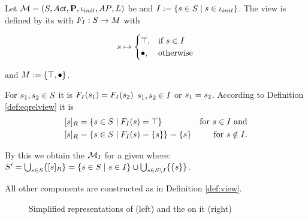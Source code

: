 \documentclass[preview]{standalone}
\begin{document}
\begin{definition}
	Let ${{{\mathcal{M}}}} = {{({S}, {Act}, {\textbf{P}}, {\iota_{init}}, {AP}, {L})}}$ be \achgphN and ${I} := \{{s} \in {S} \mid {s} \in {\ensuremath{{\iota_{init}}}}\}$. The view \viewinitstates is defined by its \grpfctN with ${{F_{{I}}}} : {S} \to {\ensuremath{{M}}}$ with 
	
	\[
	{s} \mapsto
	\begin{cases}
			{\top},				& \text{if } {s} \in {I} \\
			{\bullet},          	& \text{otherwise}
		\end{cases}
	\]
	
	and ${{M}} := {\{{\top}, {\bullet}\}}$.
\end{definition}

For ${s}_1,{s}_2 \in {S}$ it is ${{F_{{I}}}}({s}_1) = {{F_{{I}}}}({s}_2)$ \iffN ${s}_1, {s}_2 \in {I}$ or ${s}_1 = {s}_2$. According to Definition \ref{def:eqrelview} it is 
\begin{align*}
	{\ensuremath{{[{s}]_{{R}}}}} &= \{{s} \in {S} \mid {\ensuremath{{F_{{I}}}}}({s}) = {\top}\} &\text{for } {s} \in {I} \text{ and} \\
	{{[{s}]_{{R}}}} &= \{{s} \in {S} \mid {\ensuremath{{F_{{I}}}}}({s}) = \{{s}\} \} = \{{s}\} &\text{for } {s} \notin {I}.
\end{align*}


By this we obtain the \viewN ${{{{{\mathcal{M}}}}_{{I}}}}$ for a given \achgphN \chgph where: ${S}' = \bigcup_{{s} \in {S}} \{{{[{s}]_{{R}}}}\} = \{{s} \in {S} \mid {s} \in {I}\}\cup \bigcup_{{s} \in {S} \setminus {I}}\{\{{s}\}\}$.

All other components are constructed as in Definition \ref{def:view}.

\begin{figure}[h]
	\begin{minipage}{.5\textwidth}
		\hspace{5mm}
		
	\end{minipage}%
	\begin{minipage}{.5\textwidth}
		
	\end{minipage}
	\caption{Simplified representations of \mdp (left) and the \viewN \viewinitstates on it (right)}
	\label{fig:initStatesExmp}  
\end{figure}
\end{document}
